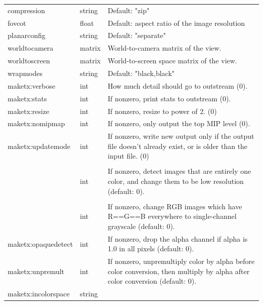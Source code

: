 \begin{longtable}{ >{\spc \cf\small}p{1.8in} >{\cf\small}l p{3in}}
   compression & string &   Default: "zip" \\
   fovcot & float &          Default: aspect ratio of the image resolution \\
   planarconfig & string &  Default: "separate" \\
   worldtocamera & matrix &  World-to-camera matrix of the view. \\
   worldtoscreen & matrix &  World-to-screen space matrix of the view. \\
   wrapmodes & string &     Default: "black,black" \\
   maketx:verbose & int &    How much detail should go to outstream (0). \\
   maketx:stats & int &      If nonzero, print stats to outstream (0). \\
   maketx:resize & int &     If nonzero, resize to power of 2. (0) \\
   maketx:nomipmap & int &   If nonzero, only output the top MIP level (0). \\
   maketx:updatemode & int &  If nonzero, write new output only if the
                             output file doesn't already exist, or is
                             older than the input file. (0) \\
   \multicolumn{2}{l}{\spc \cf\small maketx:constant_color_detect} \\  & int &
                          If nonzero, detect images that are entirely
                            one color, and change them to be low
                            resolution (default: 0). \\
   \multicolumn{2}{l}{\spc \cf\small maketx:monochrome_detect} \\ & int &
                          If nonzero, change RGB images which have
                             R==G==B everywhere to single-channel
                             grayscale (default: 0). \\
   maketx:opaquedetect & int &
                          If nonzero, drop the alpha channel if alpha
                             is 1.0 in all pixels (default: 0). \\
   maketx:unpremult & int &  If nonzero, unpremultiply color by alpha before
                             color conversion, then multiply by alpha
                             after color conversion (default: 0). \\
   {\small maketx:incolorspace} & string & \\

\end{longtable}
